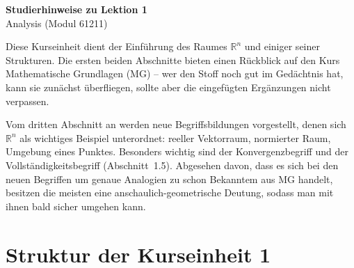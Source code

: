 \documentclass[a4paper,12pt]{article}
\begin{document}
\begin{center}
  {\LARGE\bfseries Studierhinweise zu Lektion 1}\\[0.5em]
  {\large Analysis (Modul 61211)}
\end{center}

\vspace{1em}

Diese Kurseinheit dient der Einführung des Raumes $\mathbb{R}^n$ und einiger seiner
Strukturen. Die ersten beiden Abschnitte bieten einen Rückblick auf den Kurs
Mathematische Grundlagen (MG) -- wer den Stoff noch gut im Gedächtnis hat,
kann sie zunächst überfliegen, sollte aber die eingefügten Ergänzungen nicht
verpassen.

Vom dritten Abschnitt an werden neue Begriffsbildungen vorgestellt, denen sich
$\mathbb{R}^n$ als wichtiges Beispiel unterordnet: reeller Vektorraum, normierter Raum,
Umgebung eines Punktes. Besonders wichtig sind der Konvergenzbegriff und der
Vollständigkeitsbegriff (Abschnitt~1.5). Abgesehen davon, dass es sich bei den
neuen Begriffen um genaue Analogien zu schon Bekanntem aus MG handelt,
besitzen die meisten eine anschaulich-geometrische Deutung, sodass man mit
ihnen bald sicher umgehen kann.

\section*{Struktur der Kurseinheit 1}
\end{document}
